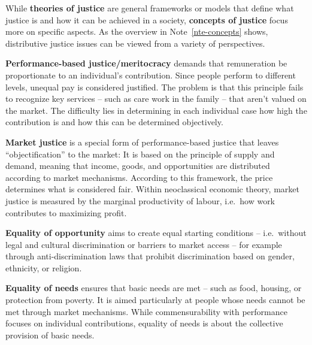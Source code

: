 \documentclass[
  a4paper,
  DIV=11,
  numbers=noendperiod,
  oneside,
  openany]{scrreprt}
\newcounter{quartocalloutnteno}
\newcommand{\quartocalloutnte}[1]{\refstepcounter{quartocalloutnteno}\label{#1}}
\begin{document}
\endgroup{}

While \textbf{theories of justice} are general frameworks or models that
define what justice is and how it can be achieved in a society,
\textbf{concepts of justice} focus more on specific aspects. As the
overview in Note~\ref{nte-concepts} shows, distributive justice issues
can be viewed from a variety of perspectives.

\begin{tcolorbox}[enhanced jigsaw, arc=.35mm, bottomrule=.15mm, bottomtitle=1mm, breakable, colback=white, colbacktitle=quarto-callout-note-color!10!white, colframe=quarto-callout-note-color-frame, coltitle=black, left=2mm, leftrule=.75mm, opacityback=0, opacitybacktitle=0.6, rightrule=.15mm, title={Note \ref*{nte-concepts}: Concepts of justice based on @novyZukunftsfaehigesWirtschaften2023}, titlerule=0mm, toprule=.15mm, toptitle=1mm]

\quartocalloutnte{nte-concepts} 

\textbf{Performance-based justice/meritocracy} demands that remuneration
be proportionate to an individual's contribution. Since people perform
to different levels, unequal pay is considered justified. The problem is
that this principle fails to recognize key services -- such as care work
in the family -- that aren't valued on the market. The difficulty lies
in determining in each individual case how high the contribution is and
how this can be determined objectively.

\textbf{Market justice} is a special form of performance-based justice
that leaves ``objectification'' to the market: It is based on the
principle of supply and demand, meaning that income, goods, and
opportunities are distributed according to market mechanisms. According
to this framework, the price determines what is considered fair. Within
neoclassical economic theory, market justice is measured by the marginal
productivity of labour, i.e.~how work contributes to maximizing profit.

\textbf{Equality of opportunity} aims to create equal starting
conditions -- i.e.~without legal and cultural discrimination or barriers
to market access -- for example through anti-discrimination laws that
prohibit discrimination based on gender, ethnicity, or religion.

\textbf{Equality of needs} ensures that basic needs are met -- such as
food, housing, or protection from poverty. It is aimed particularly at
people whose needs cannot be met through market mechanisms. While
commensurability with performance focuses on individual contributions,
equality of needs is about the collective provision of basic needs.


\end{tcolorbox}
\end{document}
